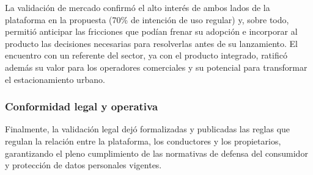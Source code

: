 La validación de mercado confirmó el alto interés de ambos lados de la plataforma en la propuesta (70\% de intención de uso regular) y, sobre todo, permitió anticipar las fricciones que podían frenar su adopción e incorporar al producto las decisiones necesarias para resolverlas antes de su lanzamiento. El encuentro con un referente del sector, ya con el producto integrado, ratificó además su valor para los operadores comerciales y su potencial para transformar el estacionamiento urbano.

\subsubsection{Conformidad legal y operativa}

Finalmente, la validación legal dejó formalizadas y publicadas las reglas que regulan la relación entre la plataforma, los conductores y los propietarios, garantizando el pleno cumplimiento de las normativas de defensa del consumidor y protección de datos personales vigentes.
